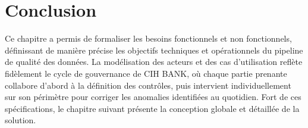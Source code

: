 \section*{Conclusion}
Ce chapitre a permis de formaliser les besoins fonctionnels et non fonctionnels, définissant de manière précise les objectifs techniques et opérationnels du pipeline de qualité des données. La modélisation des acteurs et des cas d'utilisation reflète fidèlement le cycle de gouvernance de CIH BANK, où chaque partie prenante collabore d'abord à la définition des contrôles, puis intervient individuellement sur son périmètre pour corriger les anomalies identifiées au quotidien. Fort de ces spécifications, le chapitre suivant présente la conception globale et détaillée de la solution.
